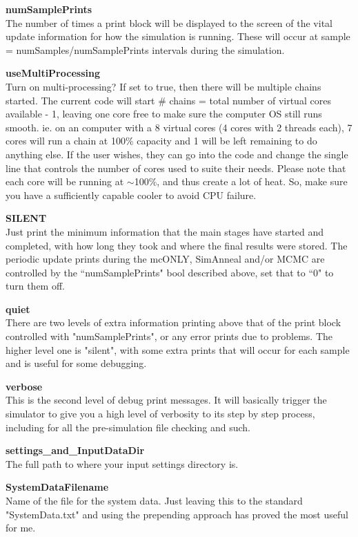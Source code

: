 \documentclass[12pt,preprint]{aastex}
\begin{document}
{\bf numSamplePrints}\\
The number of times a print block will be displayed to the screen of the vital update information for how the simulation is running.  These will occur at sample = numSamples/numSamplePrints intervals during the simulation.

{\bf useMultiProcessing}\\
Turn on multi-processing?  If set to true, then there will be multiple chains started.  The current code will start \# chains = total number of virtual cores available - 1, leaving one core free to make sure the computer OS still runs smooth. ie. on an computer with a 8 virtual cores (4 cores with 2 threads each), 7 cores will run a chain at 100\% capacity and 1 will be left remaining to do anything else.  If the user wishes, they can go into the code and change the single line that controls the number of cores used to suite their needs.  Please note that each core will be running at $\sim$100\%, and thus create a lot of heat.  So, make sure you have a sufficiently capable cooler to avoid CPU failure.

{\bf SILENT}\\
Just print the minimum information that the main stages have started and completed, with how long they took and where the final results were stored.  The periodic update prints during the mcONLY, SimAnneal and/or MCMC are controlled by the ``numSamplePrints" bool described above, set that to ``0" to turn them off.

{\bf quiet}\\
There are two levels of extra information printing above that of the print block controlled with "numSamplePrints", or any error prints due to problems.  The higher level one is "silent", with some extra prints that will occur for each sample and is useful for some debugging.

{\bf verbose}\\
This is the second level of debug print messages.  It will basically trigger the simulator to give you a high level of verbosity to its step by step process, including for all the pre-simulation file checking and such.

{\bf settings\_and\_InputDataDir}\\
The full path to where your input settings directory is.  

{\bf SystemDataFilename}\\
Name of the file for the system data.  Just leaving this to the standard "SystemData.txt" and using the prepending approach has proved the most useful for me.
\end{document}
